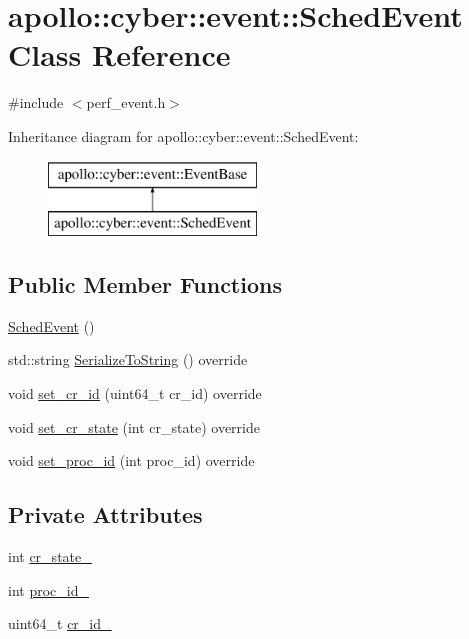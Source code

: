 \hypertarget{classapollo_1_1cyber_1_1event_1_1SchedEvent}{\section{apollo\-:\-:cyber\-:\-:event\-:\-:Sched\-Event Class Reference}
\label{classapollo_1_1cyber_1_1event_1_1SchedEvent}
}


{\ttfamily \#include $<$perf\-\_\-event.\-h$>$}

Inheritance diagram for apollo\-:\-:cyber\-:\-:event\-:\-:Sched\-Event\-:\begin{figure}[H]
\begin{center}
\leavevmode
\includegraphics[height=2.000000cm]{classapollo_1_1cyber_1_1event_1_1SchedEvent}
\end{center}
\end{figure}
\subsection*{Public Member Functions}
\begin{DoxyCompactItemize}
\item 
\hyperlink{classapollo_1_1cyber_1_1event_1_1SchedEvent_aa3b4293c23283f39ae4100d413b846f2}{Sched\-Event} ()
\item 
std\-::string \hyperlink{classapollo_1_1cyber_1_1event_1_1SchedEvent_a92a8ce80dac62e102d79010845c37b5b}{Serialize\-To\-String} () override
\item 
void \hyperlink{classapollo_1_1cyber_1_1event_1_1SchedEvent_a22cfd60eaefdf7647263d3270d3f3244}{set\-\_\-cr\-\_\-id} (uint64\-\_\-t cr\-\_\-id) override
\item 
void \hyperlink{classapollo_1_1cyber_1_1event_1_1SchedEvent_ae9b63ed13d7df3a671bb74988ff87bf6}{set\-\_\-cr\-\_\-state} (int cr\-\_\-state) override
\item 
void \hyperlink{classapollo_1_1cyber_1_1event_1_1SchedEvent_aa4d016a3c5a507c58b195e3d99f92f2b}{set\-\_\-proc\-\_\-id} (int proc\-\_\-id) override
\end{DoxyCompactItemize}
\subsection*{Private Attributes}
\begin{DoxyCompactItemize}
\item 
int \hyperlink{classapollo_1_1cyber_1_1event_1_1SchedEvent_ae668da8e1cf28c3b4d59faf493b7c050}{cr\-\_\-state\-\_\-}
\item 
int \hyperlink{classapollo_1_1cyber_1_1event_1_1SchedEvent_aee238b5d25e30195e59a5465a1a5f23c}{proc\-\_\-id\-\_\-}
\item 
uint64\-\_\-t \hyperlink{classapollo_1_1cyber_1_1event_1_1SchedEvent_a7bae23970d3df3a25ab8f29ec5e12508}{cr\-\_\-id\-\_\-}
\end{DoxyCompactItemize}
